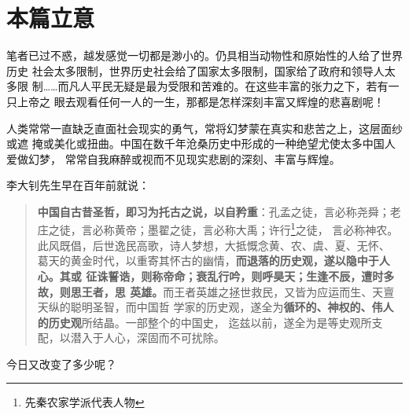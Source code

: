 



\section{本篇立意}

笔者已过不惑，越发感觉一切都是渺小的。仍具相当动物性和原始性的人给了世界历史
社会太多限制，世界历史社会给了国家太多限制，国家给了政府和领导人太多限
制……而凡人平民无疑是最为受限和苦难的。在这些丰富的张力之下，若有一只上帝之
眼去观看任何一人的一生，那都是怎样深刻丰富又辉煌的悲喜剧呢！


人类常常一直缺乏直面社会现实的勇气，常将幻梦蒙在真实和悲苦之上，这层面纱或遮
掩或美化或扭曲。中国在数千年沧桑历史中形成的一种绝望尤使太多中国人爱做幻梦，
常常自我麻醉或视而不见现实悲剧的深刻、丰富与辉煌。

李大钊先生早在百年前就说：
\begin{quotation}
  \textbf{中国自古昔圣哲，即习为托古之说，以自矜重}：孔孟之徒，言必称尧舜；老
  庄之徒，言必称黄帝；墨翟之徒，言必称大禹；许行\footnote{先秦农家学派代表人物}之徒，
  言必称神农。此风既倡，后世逸民高歌，诗人梦想，大抵慨念黄、农、虞、夏、无怀、
  葛天的黄金时代，以重寄其怀古的幽情，\textbf{而退落的历史观，遂以隐中于人心。其或
    征诛誓诰，则称帝命；衰乱行吟，则呼昊天；生逢不辰，遭时多故，则思王者，思
    英雄。}而王者英雄之拯世救民，又皆为应运而生、天亶天纵的聪明圣智，而中国哲
  学家的历史观，遂全为\textbf{循环的、神权的、伟人的历史观}所结晶。一部整个的中国史，
  迄兹以前，遂全为是等史观所支配，以潜入于人心，深固而不可扰除。
\end{quotation}
今日又改变了多少呢？

